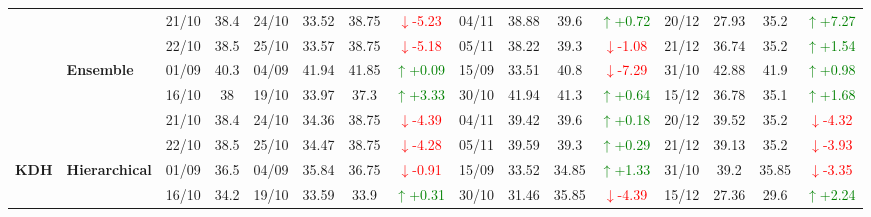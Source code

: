 {\begin{longtable}{llcc|cccc|cccc|cccc}
& 
& 21/10 & 38.4 & 24/10 & 33.52 & 38.75 & \textcolor{red}{\(\downarrow\)-5.23} & 04/11 & 38.88 & 39.6 & \textcolor{green}{\(\uparrow\)+0.72} & 20/12 & 27.93 & 35.2 & \textcolor{green}{\(\uparrow\)+7.27} \\

&
& 22/10 & 38.5 & 25/10 & 33.57 & 38.75 & \textcolor{red}{\(\downarrow\)-5.18} & 05/11 & 38.22 & 39.3 & \textcolor{red}{\(\downarrow\)-1.08} & 21/12 & 36.74 & 35.2 & \textcolor{green}{\(\uparrow\)+1.54} \\
\cmidrule(lr){2-16}


& \textbf{Ensemble}
& 01/09 & 40.3 & 04/09 & 41.94 & 41.85 & \textcolor{green}{\(\uparrow\)+0.09} & 15/09 & 33.51 & 40.8 & \textcolor{red}{\(\downarrow\)-7.29} & 31/10 & 42.88 & 41.9 & \textcolor{green}{\(\uparrow\)+0.98} \\

& 
& 16/10 & 38 & 19/10 & 33.97 & 37.3 & \textcolor{green}{\(\uparrow\)+3.33} & 30/10 & 41.94 & 41.3 & \textcolor{green}{\(\uparrow\)+0.64} & 15/12 & 36.78 & 35.1 & \textcolor{green}{\(\uparrow\)+1.68} \\

& 
& 21/10 & 38.4 & 24/10 & 34.36 & 38.75 & \textcolor{red}{\(\downarrow\)-4.39} & 04/11 & 39.42 & 39.6 & \textcolor{green}{\(\uparrow\)+0.18} & 20/12 & 39.52 & 35.2 & \textcolor{red}{\(\downarrow\)-4.32} \\

&
& 22/10 & 38.5 & 25/10 & 34.47 & 38.75 & \textcolor{red}{\(\downarrow\)-4.28} & 05/11 & 39.59 & 39.3 & \textcolor{green}{\(\uparrow\)+0.29} & 21/12 & 39.13 & 35.2 & \textcolor{red}{\(\downarrow\)-3.93} \\
\midrule



\multirow{12}{*}{\textbf{KDH}} 
& \textbf{Hierarchical}
& 01/09 & 36.5 & 04/09 & 35.84 & 36.75 & \textcolor{red}{\(\downarrow\)-0.91} & 15/09 & 33.52 & 34.85 & \textcolor{green}{\(\uparrow\)+1.33} & 31/10 & 39.2 & 35.85 & \textcolor{red}{\(\downarrow\)-3.35} \\

&
& 16/10 & 34.2 & 19/10 & 33.59 & 33.9 & \textcolor{green}{\(\uparrow\)+0.31} & 30/10 & 31.46 & 35.85 & \textcolor{red}{\(\downarrow\)-4.39} & 15/12 & 27.36 & 29.6 & \textcolor{green}{\(\uparrow\)+2.24} \\


\end{longtable}}
